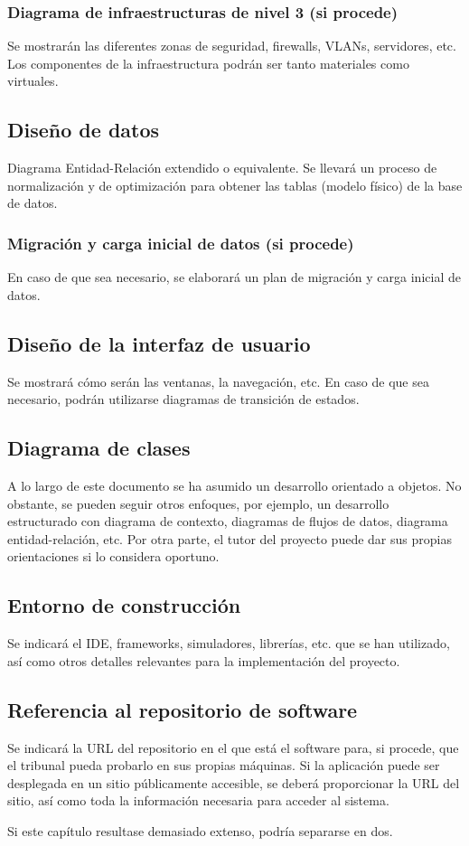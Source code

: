 \subsubsection{Diagrama de infraestructuras de nivel 3 (si procede)}
Se mostrarán las diferentes zonas de seguridad, firewalls, VLANs, servidores, etc. Los componentes de la infraestructura podrán ser tanto materiales como virtuales.


\subsection{Diseño de datos}
Diagrama Entidad-Relación extendido o equivalente. Se llevará un proceso de normalización y de optimización para obtener las tablas (modelo físico) de la base de datos.


\subsubsection{Migración y carga inicial de datos (si procede)}
En caso de que sea necesario, se elaborará un plan de migración y carga inicial de datos.

\subsection{Diseño de la interfaz de usuario}
Se mostrará cómo serán las ventanas, la navegación, etc. En caso de que sea necesario, podrán utilizarse diagramas de transición de estados.

\subsection{Diagrama de clases}
A lo largo de este documento se ha asumido un desarrollo orientado a objetos. No obstante, se pueden seguir otros enfoques, por ejemplo, un desarrollo estructurado con diagrama de contexto, diagramas de flujos de datos, diagrama entidad-relación, etc. Por otra parte, el tutor del proyecto puede dar sus propias orientaciones si lo considera oportuno.

\subsection{Entorno de construcción}
Se indicará el IDE, frameworks, simuladores, librerías, etc. que se han utilizado, así como otros detalles relevantes para la implementación del proyecto.

\subsection{Referencia al repositorio de software}
Se indicará la URL del repositorio en el que está el software para, si procede, que el tribunal pueda probarlo en sus propias máquinas. Si la aplicación puede ser desplegada en un sitio públicamente accesible, se deberá proporcionar la URL del sitio, así como toda la información necesaria para acceder al sistema.

Si este capítulo resultase demasiado extenso, podría separarse en dos.
